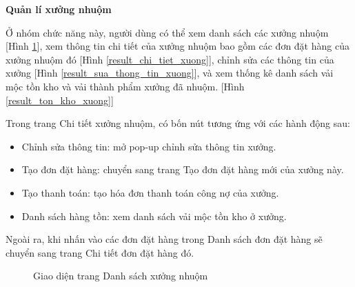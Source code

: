 \textbf{Quản lí xưởng nhuộm}

Ở nhóm chức năng này, người dùng có thể xem danh sách các xưởng nhuộm [Hình \ref{result_danh_sach_xuong}], xem thông tin chi tiết của xưởng nhuộm bao gồm các đơn đặt hàng của xưởng nhuộm đó [Hình \ref{result_chi_tiet_xuong}], chỉnh sửa các thông tin của xưởng [Hình \ref{result_sua_thong_tin_xuong}], và xem thống kê danh sách vải mộc tồn kho và vải thành phẩm xưởng đã nhuộm. [Hình \ref{result_ton_kho_xuong}]\par

Trong trang Chi tiết xưởng nhuộm, có bốn nút tương ứng với các hành động sau: 
\begin{itemize}
    \item Chỉnh sửa thông tin: mở pop-up chỉnh sửa thông tin xưởng.
    \item Tạo đơn đặt hàng: chuyển sang trang Tạo đơn đặt hàng mới của xưởng này.
    \item Tạo thanh toán: tạo hóa đơn thanh toán công nợ của xưởng.
    \item Danh sách hàng tồn: xem danh sách vải mộc tồn kho ở xưởng.
\end{itemize}

Ngoài ra, khi nhấn vào các đơn đặt hàng trong Danh sách đơn đặt hàng sẽ chuyển sang trang Chi tiết đơn đặt hàng đó.

\begin{figure}[H]
    \begin{center}
        \caption{Giao diện trang Danh sách xưởng nhuộm}
        \label{result_danh_sach_xuong}
    \end{center}
\end{figure}

